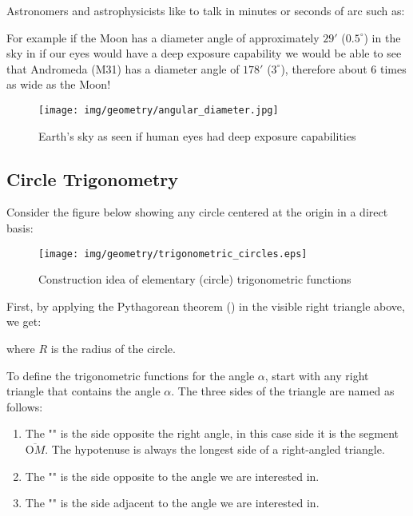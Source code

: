 	Astronomers and astrophysicists like to talk in minutes or seconds of arc such as:
	
	For example if the Moon has a diameter angle of approximately $29'$ ($0.5^\circ$) in the sky in if our eyes would have a deep exposure capability we would be able to see that Andromeda (M31) has a diameter angle of $178'$ ($3^\circ$), therefore about $6$ times as wide as the Moon!
	\begin{figure}[H]
		\centering
		\texttt{[image: img/geometry/angular\_diameter.jpg]}
		\caption[]{Earth's sky as seen if human eyes had deep exposure capabilities}
	\end{figure}

	\pagebreak
	\subsection{Circle Trigonometry}\label{circle trigonometry}
	Consider the figure below showing any circle centered at the origin in a direct basis:		
	\begin{figure}[H]
		\centering
		\texttt{[image: img/geometry/trigonometric\_circles.eps]}
		\caption{Construction idea of elementary (circle) trigonometric functions}
	\end{figure}

	First, by applying the Pythagorean theorem () in the visible right triangle above, we get:
	
where $R$ is the radius of the circle.

	To define the trigonometric functions for the angle $\alpha$, start with any right triangle that contains the angle $\alpha$. The three sides of the triangle are named as follows:
	\begin{enumerate}
		\item The "" is the side opposite the right angle, in this case side it is the segment $\overline{\text{O}M}$. The hypotenuse is always the longest side of a right-angled triangle.
		
		\item The "" is the side opposite to the angle we are interested in.
		
		\item The "" is the side adjacent to the angle we are interested in.
	\end{enumerate}


